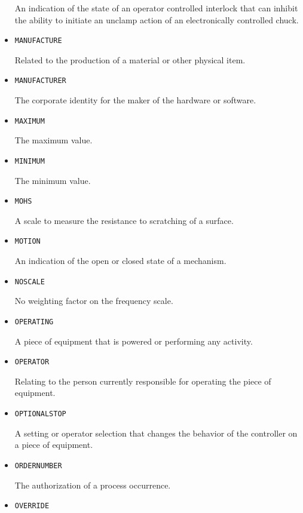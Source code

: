\begin{itemize}
An indication of the state of an operator controlled interlock that can inhibit the ability to initiate an unclamp action of an electronically controlled chuck.


\item \texttt{MANUFACTURE}  

Related to the production of a material or other physical item.


\item \texttt{MANUFACTURER}  

The corporate identity for the maker of the hardware or software.


\item \texttt{MAXIMUM}  

The maximum value.


\item \texttt{MINIMUM}  

The minimum value.


\item \texttt{MOHS}  

A scale to measure the resistance to scratching of a surface.


\item \texttt{MOTION}  

An indication of the open or closed state of a mechanism.


\item \texttt{NO\textunderscore SCALE}  

No weighting factor on the frequency scale.


\item \texttt{OPERATING}  

A piece of equipment that is powered or performing any activity.


\item \texttt{OPERATOR}  

Relating to the person currently responsible for operating the piece of equipment.


\item \texttt{OPTIONAL\textunderscore STOP}  

A setting or operator selection that changes the behavior of the controller on a piece of equipment. 


\item \texttt{ORDER\textunderscore NUMBER}  

The authorization of a process occurrence.


\item \texttt{OVERRIDE}  


\end{itemize}

